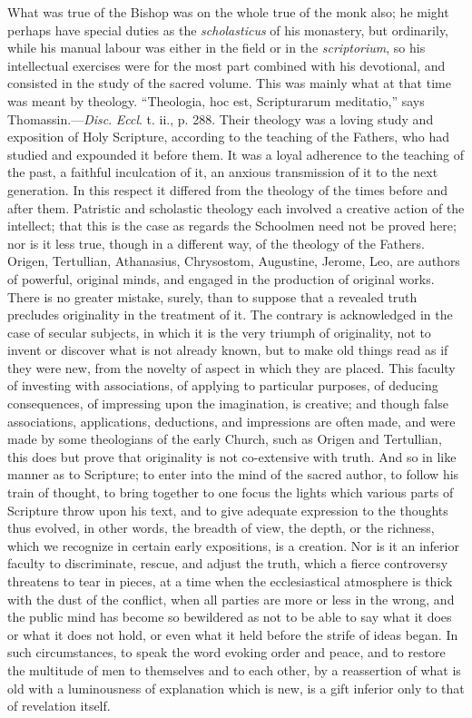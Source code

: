What was true of the Bishop was on the whole true of the monk also;
he might perhaps have special duties as the \emph{scholasticus} of his
monastery, but ordinarily, while his manual labour was either in the
field or in the \emph{scriptorium}, so his intellectual exercises were
for the most part combined with his devotional, and consisted in the
study of the sacred volume. This was mainly what at that time was
meant by theology. ``Theologia, hoc est, Scripturarum meditatio,''
says Thomassin.—\emph{Disc}. \emph{Eccl}. t. ii., p. 288. Their
theology was a loving study and exposition of Holy Scripture,
according to the teaching of the Fathers, who had studied and
expounded it before them. It was a loyal adherence to the teaching of
the past, a faithful inculcation of it, an anxious transmission of it
to the next generation. In this respect it differed from the theology
of the times before and after them. Patristic and scholastic theology
each involved a creative action of the intellect; that this is the
case as regards the Schoolmen need not be proved here; nor is it less
true, though in a different way, of the theology of the Fathers.
Origen, Tertullian, Athanasius, Chrysostom, Augustine, Jerome, Leo,
are authors of powerful, original minds, and engaged in the production
of original works. There is no greater mistake, surely, than to
suppose that a revealed truth precludes originality in the treatment
of it. The contrary is acknowledged in the case of secular subjects,
in which it is the very triumph of originality, not to invent or
discover what is not already known, but to make old things read as if
they were new, from the novelty of aspect in which they are placed.
This faculty of investing with associations, of applying to particular
purposes, of deducing consequences, of impressing upon the
imagination, is creative; and though false associations, applications,
deductions, and impressions are often made, and were made by
some theologians of the early Church, such as Origen and Tertullian,
this does but prove that originality is not co-extensive with truth.
And so in like manner as to Scripture; to enter into the mind of the
sacred author, to follow his train of thought, to bring together to
one focus the lights which various parts of Scripture throw upon his
text, and to give adequate expression to the thoughts thus evolved, in
other words, the breadth of view, the depth, or the richness, which we
recognize in certain early expositions, is a creation. Nor is it an
inferior faculty to discriminate, rescue, and adjust the truth, which
a fierce controversy threatens to tear in pieces, at a time when the
ecclesiastical atmosphere is thick with the dust of the conflict, when
all parties are more or less in the wrong, and the public mind has
become so bewildered as not to be able to say what it does or what it
does not hold, or even what it held before the strife of ideas began.
In such circumstances, to speak the word evoking order and peace, and
to restore the multitude of men to themselves and to each other, by a
reassertion of what is old with a luminousness of explanation which is
new, is a gift inferior only to that of revelation itself.

